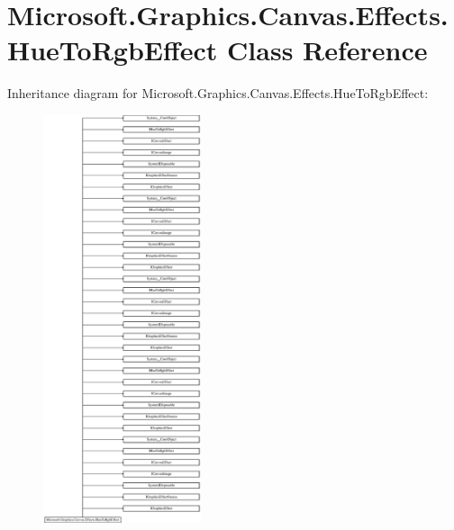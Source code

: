 \hypertarget{class_microsoft_1_1_graphics_1_1_canvas_1_1_effects_1_1_hue_to_rgb_effect}{}\section{Microsoft.\+Graphics.\+Canvas.\+Effects.\+Hue\+To\+Rgb\+Effect Class Reference}
\label{class_microsoft_1_1_graphics_1_1_canvas_1_1_effects_1_1_hue_to_rgb_effect}
Inheritance diagram for Microsoft.\+Graphics.\+Canvas.\+Effects.\+Hue\+To\+Rgb\+Effect\+:\begin{figure}[H]
\begin{center}
\leavevmode
\includegraphics[height=12.000000cm]{class_microsoft_1_1_graphics_1_1_canvas_1_1_effects_1_1_hue_to_rgb_effect}
\end{center}
\end{figure}
